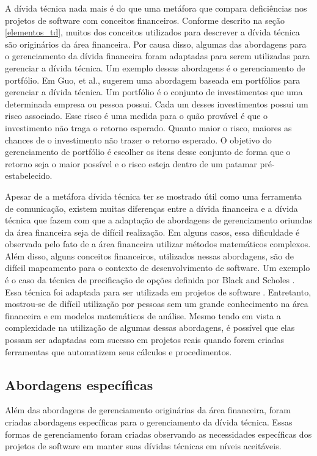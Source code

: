  A dívida técnica nada mais é do que uma metáfora que compara deficiências nos projetos de software com conceitos financeiros. Conforme descrito na seção \ref{elementos_td}, muitos dos conceitos utilizados para descrever a dívida técnica são originários da área financeira. Por causa disso, algumas das abordagens para o gerenciamento da dívida financeira foram adaptadas para serem utilizadas para gerenciar a dívida técnica. Um exemplo dessas abordagens é o gerenciamento de portfólio.  Em \cite{guo2011portfolio} Guo, et al., sugerem uma abordagem baseada em portfólios para gerenciar a dívida técnica. Um portfólio é o conjunto de investimentos que uma determinada empresa ou pessoa possui. Cada um desses investimentos possui um risco associado. Esse risco é uma medida para o quão provável é que o investimento não traga o retorno esperado. Quanto maior o risco, maiores as chances de o investimento não trazer o retorno esperado. O objetivo do gerenciamento de portfólio é escolher os itens desse conjunto de forma que o retorno seja o maior possível e o risco esteja dentro de um patamar pré-estabelecido. 


Apesar de a metáfora dívida técnica ter se mostrado útil como uma ferramenta de comunicação, existem muitas diferenças entre a dívida financeira e a dívida técnica que fazem com que a adaptação de abordagens de gerenciamento oriundas da área financeira seja de difícil realização. Em alguns casos, essa dificuldade é observada pelo fato de a área financeira utilizar métodos matemáticos complexos. Além disso, alguns conceitos financeiros, utilizados nessas abordagens, são de difícil mapeamento para o contexto de desenvolvimento de software. Um exemplo é o caso da técnica de precificação de opções definida por Black and Scholes \cite{chriss1996black}.  Essa técnica foi adaptada para ser utilizada em projetos de software \cite{benaroch1999case,alzaghoul2013cloudmtd,abad2015using}. Entretanto, mostrou-se de difícil utilização por pessoas sem um grande conhecimento na área financeira e em modelos matemáticos de análise. Mesmo tendo em vista a complexidade na utilização de algumas dessas abordagens, é possível que elas possam ser adaptadas com sucesso em projetos reais quando forem criadas ferramentas que automatizem seus cálculos e procedimentos. 


\subsection{Abordagens específicas}


Além das abordagens de gerenciamento originárias da área financeira, foram criadas abordagens  específicas para o gerenciamento da dívida técnica. Essas formas de gerenciamento foram criadas observando as necessidades específicas dos projetos de software em manter suas dívidas técnicas em níveis aceitáveis.




